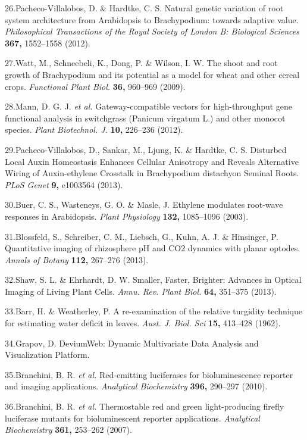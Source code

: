 \documentclass[]{article}
\begin{document}
26.Pacheco-Villalobos, D. \& Hardtke, C. S. Natural genetic variation of
root system architecture from Arabidopsis to Brachypodium: towards
adaptive value. \emph{Philosophical Transactions of the Royal Society of
London B: Biological Sciences} \textbf{367,} 1552--1558 (2012).

27.Watt, M., Schneebeli, K., Dong, P. \& Wilson, I. W. The shoot and
root growth of Brachypodium and its potential as a model for wheat and
other cereal crops. \emph{Functional Plant Biol.} \textbf{36,} 960--969
(2009).

28.Mann, D. G. J. \emph{et al.} Gateway-compatible vectors for
high-throughput gene functional analysis in switchgrass (Panicum
virgatum L.) and other monocot species. \emph{Plant Biotechnol. J.}
\textbf{10,} 226--236 (2012).

29.Pacheco-Villalobos, D., Sankar, M., Ljung, K. \& Hardtke, C. S.
Disturbed Local Auxin Homeostasis Enhances Cellular Anisotropy and
Reveals Alternative Wiring of Auxin-ethylene Crosstalk in Brachypodium
distachyon Seminal Roots. \emph{PLoS Genet} \textbf{9,} e1003564 (2013).

30.Buer, C. S., Wasteneys, G. O. \& Masle, J. Ethylene modulates
root-wave responses in Arabidopsis. \emph{Plant Physiology}
\textbf{132,} 1085--1096 (2003).

31.Blossfeld, S., Schreiber, C. M., Liebsch, G., Kuhn, A. J. \&
Hinsinger, P. Quantitative imaging of rhizosphere pH and CO2 dynamics
with planar optodes. \emph{Annals of Botany} \textbf{112,} 267--276
(2013).

32.Shaw, S. L. \& Ehrhardt, D. W. Smaller, Faster, Brighter: Advances in
Optical Imaging of Living Plant Cells. \emph{Annu. Rev. Plant Biol.}
\textbf{64,} 351--375 (2013).

33.Barr, H. \& Weatherley, P. A re-examination of the relative turgidity
technique for estimating water deficit in leaves. \emph{Aust. J. Biol.
Sci} \textbf{15,} 413--428 (1962).

34.Grapov, D. DeviumWeb: Dynamic Multivariate Data Analysis and
Visualization Platform.

35.Branchini, B. R. \emph{et al.} Red-emitting luciferases for
bioluminescence reporter and imaging applications. \emph{Analytical
Biochemistry} \textbf{396,} 290--297 (2010).

36.Branchini, B. R. \emph{et al.} Thermostable red and green
light-producing firefly luciferase mutants for bioluminescent reporter
applications. \emph{Analytical Biochemistry} \textbf{361,} 253--262
(2007).
\end{document}
